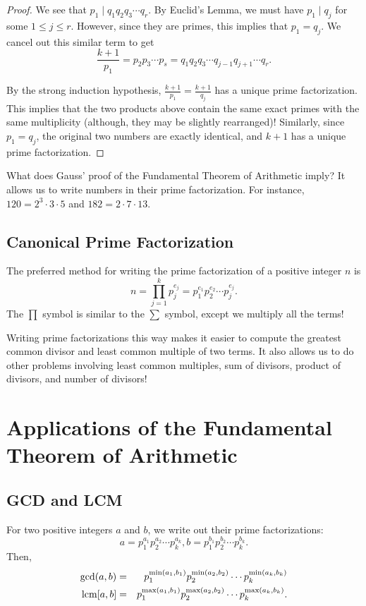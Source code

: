 \begin{proof}
We see that $p_1\mid q_1q_2q_3\cdots q_r$. By Euclid's Lemma, we must have $p_1\mid q_j$ for some $1\le j\le r$. However, since they are primes, this implies that $p_1=q_j$. We cancel out this similar term to get $$\frac{k+1}{p_1}=p_2p_3\cdots p_s=q_1q_2q_3\cdots q_{j-1}q_{j+1}\cdots q_r.$$ 

By the strong induction hypothesis, $\displaystyle \frac{k+1}{p_1}=\frac{k+1}{q_j}$ has a unique prime factorization. This implies that the two products above contain the same exact primes with the same multiplicity (although, they may be slightly rearranged)! Similarly, since $p_1=q_j$, the original two numbers are exactly identical, and $k+1$ has a unique prime factorization.  \end{proof}

What does Gauss' proof of the Fundamental Theorem of Arithmetic imply? It allows us to write numbers in their prime factorization. For instance, $120=2^3\cdot 3\cdot 5$ and $182=2\cdot 7\cdot 13$. 

\clearpage

\subsection{Canonical Prime Factorization}

The preferred method for writing the prime factorization of a positive integer $n$ is $$n=\prod_{j=1}^{k}p_j^{e_j}=p_1^{e_1}p_2^{e_2}\cdots p_j^{e_j}.$$ 
The $\prod$ symbol is similar to the $\sum$ symbol, except we multiply all the terms!

Writing prime factorizations this way makes it easier to compute the greatest common divisor and least common multiple of two terms. It also allows us to do other problems involving least common multiples, sum of divisors, product of divisors, and number of divisors!  

\section{Applications of the Fundamental Theorem of Arithmetic}

\subsection{GCD and LCM}

For two positive integers $a$ and $b$, we write out their prime factorizations: $$a=p_1^{a_1}p_2^{a_2}\cdots p_k^{a_k}, b=p_1^{b_1}p_2^{b_2}\cdots p_k^{b_k}.$$ Then, \begin{eqnarray*} \gcd(a,b)&=&p_1^{\min(a_1, b_1)}p_2^{\min(a_2, b_2)}\cdots p_k^{\min(a_k, b_k)} \\ \operatorname{lcm}[a,b]&=&p_1^{\max(a_1, b_1)}p_2^{\max(a_2, b_2)}\cdots p_k^{\max(a_k, b_k)}. \end{eqnarray*}
\clearpage

